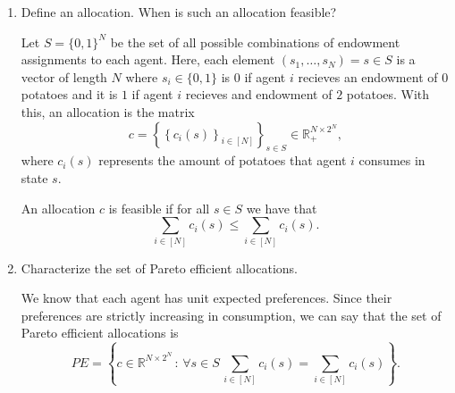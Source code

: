 \documentclass[11pt,english]{article}
\begin{document}
\begin{enumerate}
    \item[(1)] Define an allocation. When is such an allocation feasible?
    \begin{solution}
Let $S = \{0,1\}^N$ be the set of all possible combinations of endowment assignments to each agent. Here, each element $(s_1, \ldots, s_N) = s\in S$ is a vector of length $N$ where $s_i \in \{0,1\}$ is $0$ if agent $i$ recieves an endowment of 0 potatoes and it is $1$ if agent $i$ recieves and endowment of $2$ potatoes. With this, an allocation is the matrix $$c = \left\{\left\{c_i(s)\right\}_{i\in [N]}\right\}_{s\in S} \in \mathbb{R}^{N\times 2^N}_+,$$ where $c_i(s)$ represents the amount of potatoes that agent $i$ consumes in state $s$. 

An allocation $c$ is feasible if for all $s\in S$ we have that $$\sum_{i\in [N]}c_i(s) \leq \sum_{i\in [N]}c_i(s).$$
    \end{solution}
 
    \item[(2)] Characterize the set of Pareto efficient allocations.
    \begin{solution}
 We know that each agent has unit expected preferences. Since their preferences are strictly increasing in consumption, we can say that the set of Pareto efficient allocations is $$PE = \left\{c \in \mathbb{R}^{N \times 2^N}\,:\,\forall s\in S\,\sum_{i\in [N]}c_i(s) = \sum_{i\in [N]}c_i(s)\right\}.$$
    \end{solution}
 

\end{enumerate}
\end{document}
